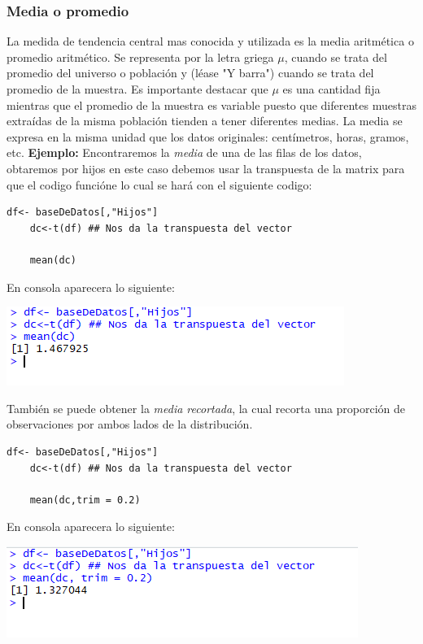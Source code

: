 \documentclass[12pt,hidelinks]{article}
\begin{document}
	\subsubsection{Media o promedio} La medida de tendencia central mas conocida y utilizada es la media aritmética o promedio aritmético. Se representa por la letra griega $\mu$, cuando se trata del promedio del universo o población y (léase "Y barra") cuando se trata del promedio de la muestra. Es importante destacar que $\mu$ es una cantidad fija mientras que el promedio de la muestra es variable puesto que diferentes muestras extraídas de la misma población tienden a tener diferentes medias. La media se expresa en la misma unidad que los datos originales: centímetros, horas, gramos, etc.\newline
	\textbf{Ejemplo:}
	\vspace{1mm}
	Encontraremos la \textit{media} de una de las filas de los datos, obtaremos por hijos  en este caso debemos usar la transpuesta de la matrix para que el codigo funcióne lo cual se hará con el siguiente codigo:
	\begin{lstlisting}[frame=single]
	df<- baseDeDatos[,"Hijos"]
	dc<-t(df) ## Nos da la transpuesta del vector
	
	mean(dc)
	\end{lstlisting}
	En consola aparecera lo siguiente:
	\begin{center}
		\includegraphics[]{images/2/media.PNG}
	\end{center}
	También se puede obtener la \textit{media recortada}, la cual recorta una proporción de observaciones por ambos lados de la distribución.
	\begin{lstlisting}[frame=single]
	df<- baseDeDatos[,"Hijos"]
	dc<-t(df) ## Nos da la transpuesta del vector
	
	mean(dc,trim = 0.2)
	\end{lstlisting}
	En consola aparecera lo siguiente:
	\begin{center}
		\includegraphics[]{images/2/mediaR.PNG}
	\end{center}
\end{document}
